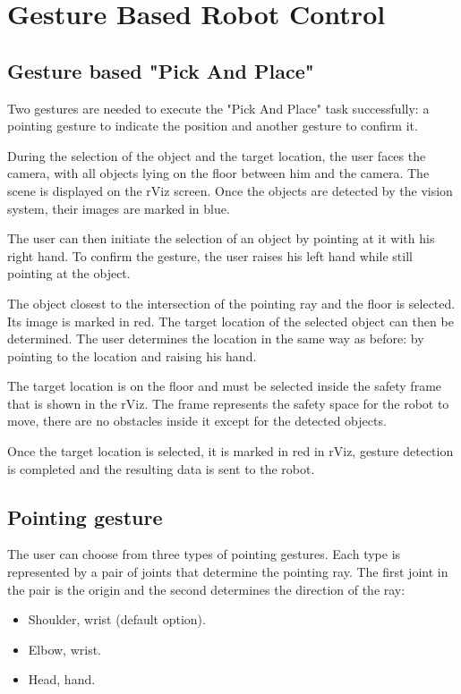 \chapter{Gesture Based Robot Control}

\section{Gesture based "Pick And Place"}
Two gestures are needed to execute the "Pick And Place" task successfully: a pointing gesture to indicate the position and another gesture to confirm it.\par
During the selection of the object and the target location, the user faces the camera, with all objects lying on the floor between him and the camera. The scene is displayed on the rViz screen. Once the objects are detected by the vision system, their images are marked in blue.\par
The user can then initiate the selection of an object by pointing at it with his right hand. To confirm the gesture, the user raises his left hand while still pointing at the object.\par
The object closest to the intersection of the pointing ray and the floor is selected. Its image is marked in red.
The target location of the selected object can then be determined. The user determines the location in the same way as before: by pointing to the location and raising his hand.\par
The target location is on the floor and must be selected inside the safety frame that is shown in the rViz. The frame represents the safety space for the robot to move, there are no obstacles inside it except for the detected objects. \par
Once the target location is selected, it is marked in red in rViz, gesture detection is completed and the resulting data is sent to the robot.\par

\section{Pointing gesture}
The user can choose from three types of pointing gestures. Each type is represented by a pair of joints that determine the pointing ray. The first joint in the pair is the origin and the second determines the direction of the ray:\par
\begin{itemize}
	\item Shoulder, wrist (default option).
    \item Elbow, wrist.
    \item Head, hand.
\end{itemize}

